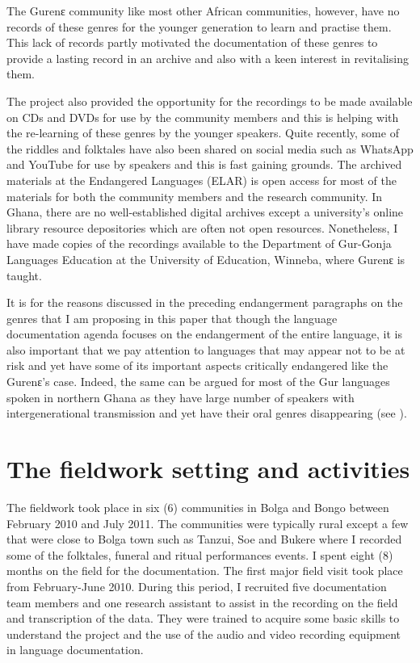 \documentclass[output=paper,colorlinks,citecolor=brown]{langscibook}
\begin{document}
The Gurenɛ community like most other African communities, however, have no records of these genres for the younger generation to learn and practise them. This lack of records partly motivated the documentation of these genres to provide a lasting record in an archive and also with a keen interest in revitalising them. 

The project also provided the opportunity for the recordings to be made available on CDs and DVDs for use by the community members and this is helping with the re-learning of these genres by the younger speakers. Quite recently, some of the riddles and folktales have also been shared on social media such as WhatsApp and YouTube for use by speakers and this is fast gaining grounds. The archived materials at the Endangered Languages (ELAR) is open access for most of the materials for both the community members and the research community. In Ghana, there are no well-established digital archives except a university’s online library resource depositories which are often not open resources. Nonetheless, I have made copies of the recordings available to the Department of Gur-Gonja Languages Education at the University of Education, Winneba, where Gurenԑ is taught.

It is for the reasons discussed in the preceding endangerment paragraphs on the genres that  
I am proposing in this paper that though the language documentation agenda focuses on the endangerment of the entire language, it is also important that we pay attention to languages that may appear not to be at risk and yet have some of its important aspects critically endangered like the Gurenɛ’s case. Indeed, the same can be argued for most of the Gur languages spoken in northern Ghana as they have large number of speakers with intergenerational transmission and yet have their oral genres disappearing (see \citealt{Bodomo2004, Bodomo2020}).

\section{The fieldwork setting and activities}
The fieldwork took place in six (6) communities in Bolga and Bongo between February 2010 and July 2011. The communities were typically rural except a few that were close to Bolga town such as Tanzui, Soe and Bukere where I recorded some of the folktales, funeral and ritual performances events. I spent eight (8) months on the field for the documentation. The first major field visit took place from February-June 2010. During this period, I recruited five documentation team members and one research assistant to assist in the recording on the field and transcription of the data. They were trained to acquire some basic skills to understand the project and the use of the audio and video recording equipment in language documentation. 
\end{document}
